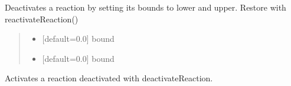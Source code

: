 \documentclass[letterpaper,12pt,english]{sphinxmanual}
\begin{document}
\begin{fulllineitems}
\begin{fulllineitems}
\label{\detokenize{api/core:cbmpy.CBModel.ReactionNew.deactivateReaction}}
\pysigstartsignatures
\pysiglinewithargsret
{}
{\sphinxparamcomma {}\sphinxparamcomma {}}
{}
\pysigstopsignatures
\sphinxAtStartPar
Deactivates a reaction by setting its bounds to lower and upper. Restore with reactivateReaction()
\begin{quote}\begin{description}
\begin{itemize}
\item {} 
\sphinxAtStartPar
{} \textendash{} {[}default=0.0{]} bound

\item {} 
\sphinxAtStartPar
{} \textendash{} {[}default=0.0{]} bound

\end{itemize}

\end{description}\end{quote}

\end{fulllineitems}


\begin{fulllineitems}
\label{\detokenize{api/core:cbmpy.CBModel.ReactionNew.reactivateReaction}}
\pysigstartsignatures
\pysiglinewithargsret
{}
{}
{}
\pysigstopsignatures
\sphinxAtStartPar
Activates a reaction deactivated with deactivateReaction.

\end{fulllineitems}


\begin{fulllineitems}
\label{\detokenize{api/core:cbmpy.CBModel.ReactionNew.setObjRefOnComponents}}
\pysigstartsignatures
\pysiglinewithargsret
{}
{}
{}
\pysigstopsignatures
\end{fulllineitems}


\end{fulllineitems}
\end{document}
